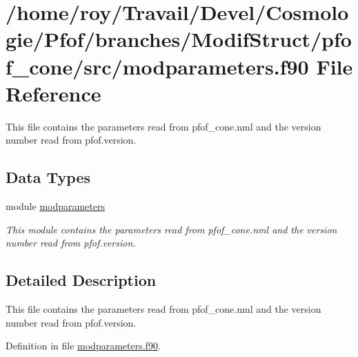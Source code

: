 \hypertarget{modparameters_8f90}{\section{/home/roy/\-Travail/\-Devel/\-Cosmologie/\-Pfof/branches/\-Modif\-Struct/pfof\-\_\-cone/src/modparameters.f90 File Reference}
\label{modparameters_8f90}
}


This file contains the parameters read from pfof\-\_\-cone.\-nml and the version number read from pfof.\-version.  


\subsection*{Data Types}
\begin{DoxyCompactItemize}
\item 
module \hyperlink{classmodparameters}{modparameters}
\begin{DoxyCompactList}\small\item\em This module contains the parameters read from pfof\-\_\-cone.\-nml and the version number read from pfof.\-version. \end{DoxyCompactList}\end{DoxyCompactItemize}


\subsection{Detailed Description}
This file contains the parameters read from pfof\-\_\-cone.\-nml and the version number read from pfof.\-version. 

Definition in file \hyperlink{modparameters_8f90_source}{modparameters.\-f90}.

